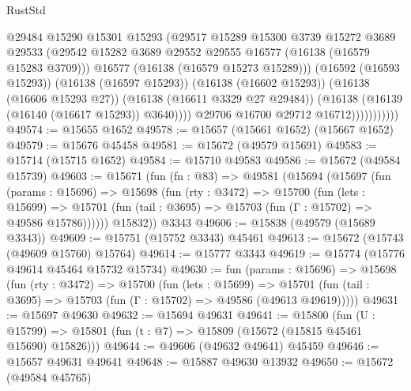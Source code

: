 \begin{lexlean}{RustStd}
\begin{coremodule}
                              @29484
                              @15290
                              @15301
                              @15293
                              (@29517
                                @15289
                                @15300
                                @3739
                                @15272
                                @3689
                                @29533
                                (@29542
                                  @15282
                                  @3689
                                  @29552
                                  @29555
                                  @16577
                                  (@16138 (@16579 @15283 @3709)))
                                @16577
                                (@16138 (@16579 @15273 @15289)))
                              (@16592 (@16593 @15293))
                              (@16138 (@16597 @15293))
                              (@16138 (@16602 @15293))
                              (@16138 (@16606 @15293 @27))
                              (@16138 (@16611 @3329 @27 @29484))
                              (@16138 (@16139 (@16140 (@16617 @15293)) @3640))))
                          @29706
                          @16700
                          @29712
                          @16712)))))))))))
@49574 := @15655 @1652
@49578 := @15657 (@15661 @1652) (@15667 @1652)
@49579 := @15676 @45458
@49581 := @15672 (@49579 @15691)
@49583 := @15714 (@15715 @1652)
@49584 := @15710 @49583
@49586 := @15672 (@49584 @15739)
@49603 := @15671
    (fun (fn : @83) =>
    @49581
      (@15694
        (@15697
          (fun (params : @15696) =>
          @15698
            (fun (rty : @3472) =>
            @15700
              (fun (lets : @15699) =>
              @15701 (fun (tail : @3695) => @15703 (fun (Γ : @15702) => @49586 @15786))))))
        @15832))
    @3343
@49606 := @15838 (@49579 (@15689 @3343))
@49609 := @15751 (@15752 @3343) @45461
@49613 := @15672 (@15743 (@49609 @15760) @15764)
@49614 := @15777 @3343
@49619 := @15774 (@15776 @49614 @45464 @15732 @15734)
@49630 := fun (params : @15696) =>
  @15698
    (fun (rty : @3472) =>
    @15700
      (fun (lets : @15699) =>
      @15701 (fun (tail : @3695) => @15703 (fun (Γ : @15702) => @49586 (@49613 @49619)))))
@49631 := @15697 @49630
@49632 := @15694 @49631
@49641 := @15800
    (fun (U : @15799) => @15801 (fun (t : @7) => @15809 (@15672 (@15815 @45461 @15690) @15826)))
@49644 := @49606 (@49632 @49641) @45459
@49646 := @15657 @49631 @49641
@49648 := @15887 @49630 @13932
@49650 := @15672 (@49584 @45765)

\end{coremodule}
\end{lexlean}
